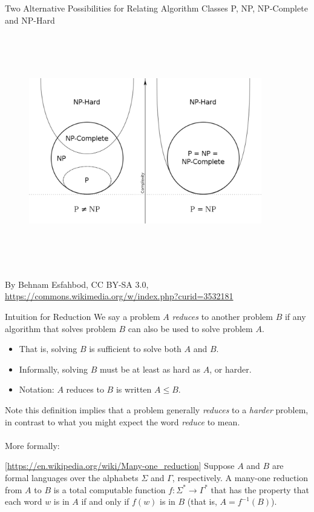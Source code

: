 \documentclass[style=sailor,size=12pt]{powerdot}
\begin{document}
\begin{wideslide}[bm=,toc=]{Two Alternative Possibilities for Relating Algorithm
  Classes P, NP, NP-Complete and NP-Hard}

\begin{figure}[h]
\centering
\includegraphics[width=4in, height=4in,keepaspectratio=true]{np_np-complete_np-hard.eps}
\label{2sp}
\end{figure}
By Behnam Esfahbod, CC BY-SA 3.0, \url{https://commons.wikimedia.org/w/index.php?curid=3532181}
\end{wideslide}

\begin{wideslide}[bm=,toc=]{Intuition for Reduction}
We say a problem $A$ \emph{reduces} to another problem $B$ if any algorithm that
solves problem $B$ can also be used to solve problem $A$.
\begin{itemize}
\item That is, solving $B$ is sufficient to solve both $A$ and $B$.
\item Informally, solving $B$ must be at least as hard as $A$, or harder.
\item Notation: $A$ reduces to $B$ is written $A \leq B$.
\end{itemize}
Note this definition implies that a problem generally \emph{reduces} to a
\emph{harder} problem, in contrast to what you might expect the word
\emph{reduce} to mean.
\\~\\
More formally: 
\vspace{-2ex}
\begin{defn}{}[\url{https://en.wikipedia.org/wiki/Many-one_reduction}]
Suppose $A$ and $B$ are formal languages over the alphabets $\Sigma$ and $\Gamma$, 
respectively. A many-one reduction from $A$ to $B$ is a total computable function 
$f : \Sigma^* \to \Gamma^*$ that has the property that each word $w$ is in $A$ if and only 
if $f(w)$ is in $B$ (that is, $A=f^{-1}(B)$).
\end{defn}
\end{wideslide}
\end{document}
